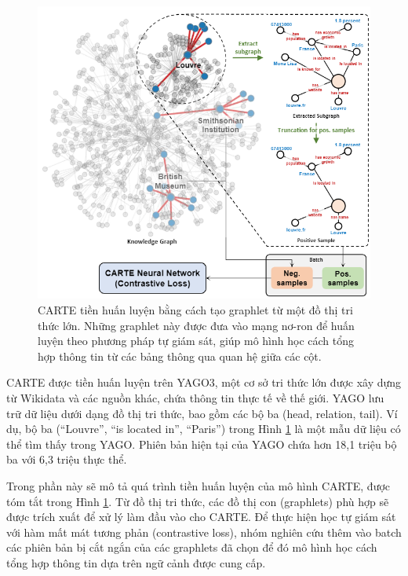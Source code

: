 \documentclass{article}
\begin{document}
\begin{figure} 
    \centering
    \includegraphics[scale = 0.8]{carte_pretraining_process.png}
    \caption{CARTE tiền huấn luyện bằng cách tạo graphlet từ một đồ thị tri thức lớn. Những graphlet này được đưa vào mạng nơ-ron để huấn luyện theo phương pháp tự giám sát, giúp mô hình học cách tổng hợp thông tin từ các bảng thông qua quan hệ giữa các cột.}
    \label{fig:carte_pretraining_process}
\end{figure}

CARTE được tiền huấn luyện trên YAGO3, một cơ sở tri thức lớn được xây dựng từ Wikidata và các nguồn khác, chứa thông tin thực tế về thế giới. YAGO lưu trữ dữ liệu dưới dạng đồ thị tri thức, bao gồm các bộ ba (head, relation, tail). Ví dụ, bộ ba (“Louvre”, “is located in”, “Paris”) trong Hình \ref{fig:carte_pretraining_process} là một mẫu dữ liệu có thể tìm thấy trong YAGO. Phiên bản hiện tại của YAGO chứa hơn 18,1 triệu bộ ba với 6,3 triệu thực thể.

Trong phần này sẽ mô tả quá trình tiền huấn luyện của mô hình CARTE, được tóm tắt trong Hình \ref{fig:carte_pretraining_process}. Từ đồ thị tri thức, các đồ thị con (graphlets) phù hợp sẽ được trích xuất để xử lý làm đầu vào cho CARTE. Để thực hiện học tự giám sát với hàm mất mát tương phản (contrastive loss), nhóm nghiên cứu thêm vào batch các phiên bản bị cắt ngắn của các graphlets đã chọn để đó mô hình học cách tổng hợp thông tin dựa trên ngữ cảnh được cung cấp.
\end{document}
